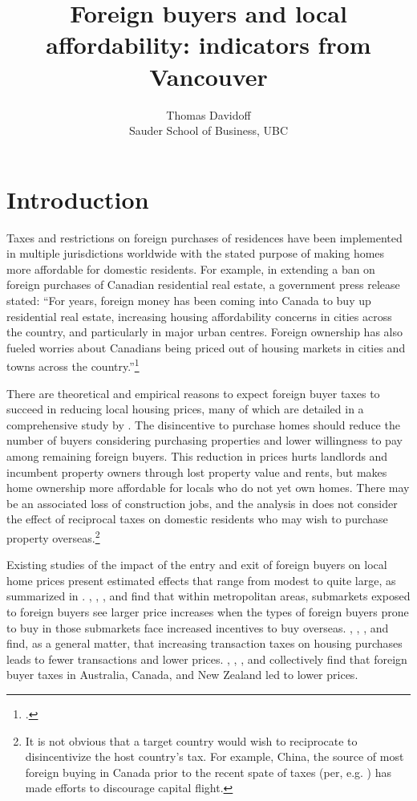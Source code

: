 \documentclass[12pt]{article}
\begin{document}
\title{Foreign buyers and local affordability: indicators from Vancouver}
\author{Thomas Davidoff\\Sauder School of Business, UBC}

\section{Introduction}

Taxes and restrictions on foreign purchases of residences have been implemented
in multiple jurisdictions worldwide with the stated purpose of making homes
more affordable for domestic residents. For example, in extending a ban on
foreign purchases of Canadian residential real estate, a government press
release stated: ``For years, foreign money has been coming into Canada to buy
up residential real estate, increasing housing affordability concerns in cities
across the country, and particularly in major urban centres. Foreign ownership
has also fueled worries about Canadians being priced out of housing markets in
cities and towns across the country.''\footnote{\textcite{gOC}.}

There are theoretical and empirical reasons to expect foreign buyer taxes to
succeed in reducing local housing prices, many of which are detailed in a
comprehensive study by \textcite{favilukisVanNieuwerburgh}. The disincentive to
purchase homes should reduce the number of buyers considering purchasing
properties and lower willingness to pay among remaining foreign buyers. This
reduction in prices hurts landlords and incumbent property owners through lost
property value and rents, but makes home ownership more affordable for locals
who do not yet own homes. There may be an associated loss of construction jobs,
and the analysis in \textcite{favilukisVanNieuwerburgh} does not consider the
effect of reciprocal taxes on domestic residents who may wish to purchase
property overseas.\footnote{It is not obvious that a target country would wish
	to reciprocate to disincentivize the host country's tax. For example,
	China, the source of most foreign buying in Canada prior to the recent
spate of taxes (per, e.g. \textcite{ctvNews}) has made efforts to discourage capital
flight.}

Existing studies of the impact of the entry and exit of foreign buyers on local home prices
present estimated effects that range from modest to quite large, as summarized
in \textcite{davidoffZheng}. \textcite{LiShenZhang},
\textcite{gorbackGlobalCapitalLocal2020}, \textcite{pavlovImmigrationFlows},
and \textcite{BadarinzaRamadorai} find that within metropolitan areas,
submarkets exposed to foreign buyers see larger price increases when the types
of foreign buyers prone to buy in those submarkets face increased incentives to
buy overseas. \textcite{DachisDurantonTurner}, \textcite{klevenBest},
\textcite{kopczukMunroe}, and \textcite{davidoffLeigh} find, as a general
matter, that increasing transaction taxes on housing purchases leads to fewer
transactions and lower prices. \textcite{HartleyForeign},
\textcite{andalfattoEstimatingEffectMetro2023}, \textcite{DuYinZhang}, and
\textcite{pavlovForeignBuyerTaxes} collectively find that foreign buyer taxes
in Australia, Canada, and New Zealand led to lower prices.
\end{document}
